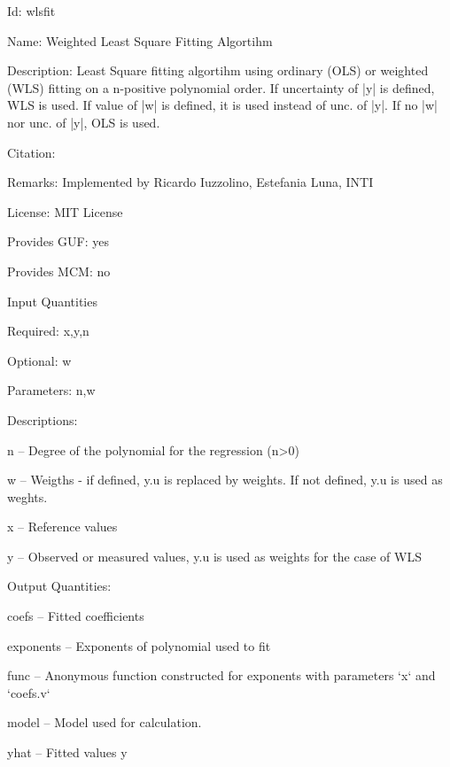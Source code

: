 \begin{tightdesc}
\item [Id:] wlsfit
\item [Name:] Weighted Least Square Fitting Algortihm
\item [Description:] Least Square fitting algortihm using ordinary (OLS) or weighted (WLS) fitting on a n-positive polynomial order. If uncertainty of |y| is defined, WLS is used. If value of |w| is defined, it is used instead of unc. of |y|. If no |w| nor unc. of |y|, OLS is used.
\item [Citation:] 
\item [Remarks:] Implemented by Ricardo Iuzzolino, Estefania Luna, INTI
\item [License:] MIT License
\item [Provides GUF:] yes
\item [Provides MCM:] no
\item [Input Quantities] \rule{0em}{0em}
    \begin{tightdesc}
    \item [Required:] 
        \textsf{x},\enspace \textsf{y},\enspace \textsf{n}
    \item [Optional:] 
        \textsf{w}
    \item [Parameters:] 
        \textsf{n},\enspace \textsf{w}
    \item [Descriptions:] \rule{0em}{0em}
        \begin{tightdesc}
            \item[\textsf{n}] -- Degree of the polynomial for the regression (n>0)
            \item[\textsf{w}] -- Weigths - if defined, y.u is replaced by weights. If not defined, y.u is used as weghts.
            \item[\textsf{x}] -- Reference values
            \item[\textsf{y}] -- Observed or measured values, y.u is used as weights for the case of WLS
        \end{tightdesc}
    \end{tightdesc}
\item [Output Quantities:] \rule{0em}{0em}
    \begin{tightdesc}
        \item[\textsf{coefs}] -- Fitted coefficients
        \item[\textsf{exponents}] -- Exponents of polynomial used to fit
        \item[\textsf{func}] -- Anonymous function constructed for exponents with parameters `x` and `coefs.v`
        \item[\textsf{model}] -- Model used for calculation.
        \item[\textsf{yhat}] -- Fitted values y
    \end{tightdesc}
\end{tightdesc}
